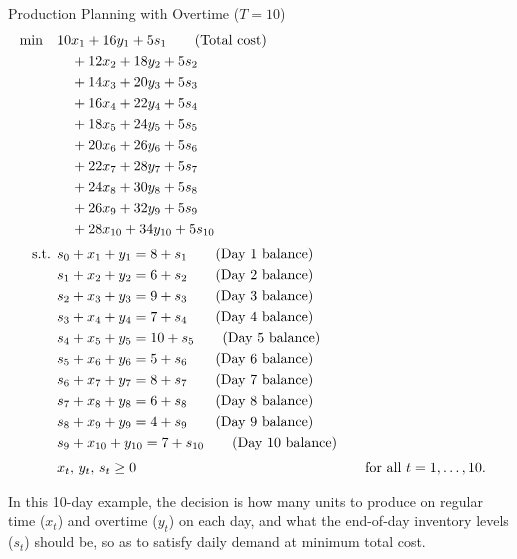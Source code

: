 \begin{examplewithallcode}{Production Planning with Overtime (\(T = 10\))}
\begin{align*}
\min \quad & 10x_1 + 16y_1 + 5s_1   \tag{Total cost} \\
             & \quad + 12x_2 + 18y_2 + 5s_2 \\
             & \quad + 14x_3 + 20y_3 + 5s_3 \\
             & \quad + 16x_4 + 22y_4 + 5s_4 \\
             & \quad + 18x_5 + 24y_5 + 5s_5 \\
             & \quad + 20x_6 + 26y_6 + 5s_6 \\
             & \quad + 22x_7 + 28y_7 + 5s_7 \\
             & \quad + 24x_8 + 30y_8 + 5s_8 \\
             & \quad + 26x_9 + 32y_9 + 5s_9 \\
             & \quad + 28x_{10} + 34y_{10} + 5s_{10} \\[1mm]
\text{ s.t. }        & s_0 + x_1 + y_1 = 8 + s_1   \tag{Day 1 balance} \\
             & s_1 + x_2 + y_2 = 6 + s_2   \tag{Day 2 balance} \\
             & s_2 + x_3 + y_3 = 9 + s_3   \tag{Day 3 balance} \\
             & s_3 + x_4 + y_4 = 7 + s_4   \tag{Day 4 balance} \\
             & s_4 + x_5 + y_5 = 10 + s_5   \tag{Day 5 balance} \\
             & s_5 + x_6 + y_6 = 5 + s_6   \tag{Day 6 balance} \\
             & s_6 + x_7 + y_7 = 8 + s_7   \tag{Day 7 balance} \\
             & s_7 + x_8 + y_8 = 6 + s_8   \tag{Day 8 balance} \\
             & s_8 + x_9 + y_9 = 4 + s_9   \tag{Day 9 balance} \\
             & s_9 + x_{10} + y_{10} = 7 + s_{10}   \tag{Day 10 balance} \\[1mm]
             & x_t,\, y_t,\, s_t \ge 0 &&\quad \text{for all } t = 1,\dots,10.
\end{align*}

In this 10-day example, the decision is how many units to produce on regular time (\(x_t\)) and overtime (\(y_t\)) on each day, and what the end-of-day inventory levels (\(s_t\)) should be, so as to satisfy daily demand at minimum total cost.

\end{examplewithallcode}


